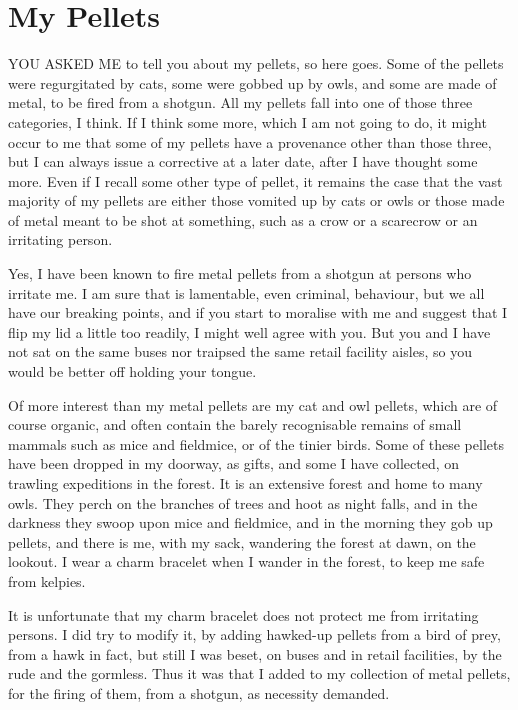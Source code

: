 \chapter{My Pellets}

YOU ASKED ME to tell you about my pellets, so here goes. Some of the pellets were regurgitated by cats, some were gobbed up by owls, and some are made of metal, to be fired from a shotgun. All my pellets fall into one of those three categories, I think. If I think some more, which I am not going to do, it might occur to me that some of my pellets have a provenance other than those three, but I can always issue a corrective at a later date, after I have thought some more. Even if I recall some other type of pellet, it remains the case that the vast majority of my pellets are either those vomited up by cats or owls or those made of metal meant to be shot at something, such as a crow or a scarecrow or an irritating person.

Yes, I have been known to fire metal pellets from a shotgun at persons who irritate me. I am sure that is lamentable, even criminal, behaviour, but we all have our breaking points, and if you start to moralise with me and suggest that I flip my lid a little too readily, I might well agree with you. But you and I have not sat on the same buses nor traipsed the same retail facility aisles, so you would be better off holding your tongue.

Of more interest than my metal pellets are my cat and owl pellets, which are of course organic, and often contain the barely recognisable remains of small mammals such as mice and fieldmice, or of the tinier birds. Some of these pellets have been dropped in my doorway, as gifts, and some I have collected, on trawling expeditions in the forest. It is an extensive forest and home to many owls. They perch on the branches of trees and hoot as night falls, and in the darkness they swoop upon mice and fieldmice, and in the morning they gob up pellets, and there is me, with my sack, wandering the forest at dawn, on the lookout. I wear a charm bracelet when I wander in the forest, to keep me safe from kelpies.

It is unfortunate that my charm bracelet does not protect me from irritating persons. I did try to modify it, by adding hawked-up pellets from a bird of prey, from a hawk in fact, but still I was beset, on buses and in retail facilities, by the rude and the gormless. Thus it was that I added to my collection of metal pellets, for the firing of them, from a shotgun, as necessity demanded.

